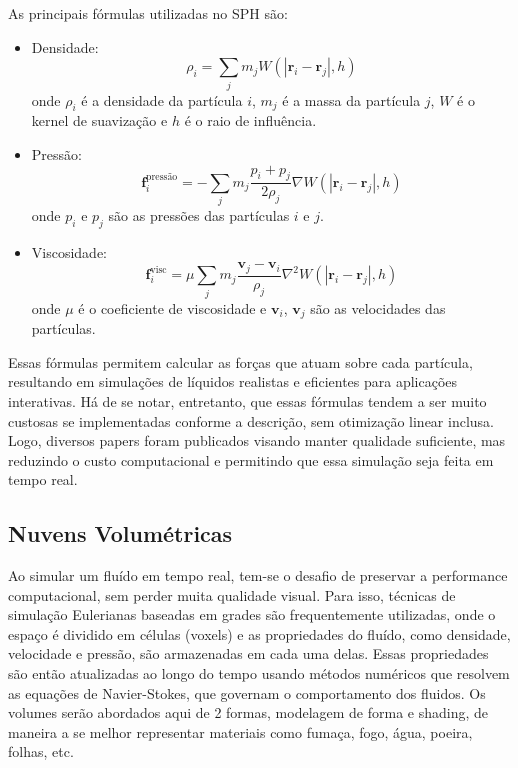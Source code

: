 As principais fórmulas utilizadas no SPH são:

\begin{itemize}
  \item Densidade: $$
\rho_i = \sum_j m_j W(|\mathbf{r}_i - \mathbf{r}_j|, h)
$$
onde $\rho_i$ é a densidade da partícula $i$, $m_j$ é a massa da partícula $j$, $W$ é o kernel de suavização e $h$ é o raio de influência.

\item Pressão: $$
\mathbf{f}_i^{\text{pressão}} = -\sum_j m_j \frac{p_i + p_j}{2 \rho_j} \nabla W(|\mathbf{r}_i - \mathbf{r}_j|, h)
$$
onde $p_i$ e $p_j$ são as pressões das partículas $i$ e $j$.

\item Viscosidade: $$
\mathbf{f}_i^{\text{visc}} = \mu \sum_j m_j \frac{\mathbf{v}_j - \mathbf{v}_i}{\rho_j} \nabla^2 W(|\mathbf{r}_i - \mathbf{r}_j|, h) $$ onde $\mu$ é o coeficiente de viscosidade e $\mathbf{v}_i$, $\mathbf{v}_j$ são as velocidades das partículas.
\end{itemize}

Essas fórmulas permitem calcular as forças que atuam sobre cada partícula, resultando em simulações de líquidos realistas e eficientes para aplicações interativas. Há de se notar, entretanto, que essas fórmulas tendem a ser muito custosas se implementadas conforme a descrição, sem otimização linear inclusa. Logo, diversos papers foram publicados visando manter qualidade suficiente, mas reduzindo o custo computacional e permitindo que essa simulação seja feita em tempo real. 


\subsection{Nuvens Volumétricas}
\label{sec:volumes}

Ao simular um fluído em tempo real, tem-se o desafio de preservar a performance computacional, sem perder muita qualidade visual. Para isso, técnicas de simulação Eulerianas baseadas em grades são frequentemente utilizadas,  onde o espaço é dividido em células (voxels) e as propriedades do fluído, como densidade, velocidade e pressão, são armazenadas em cada uma delas. Essas propriedades são então atualizadas ao longo do tempo usando métodos numéricos que resolvem as equações de Navier-Stokes, que governam o comportamento dos fluidos. Os volumes serão abordados aqui de 2 formas, modelagem de forma e shading, de maneira a se melhor representar materiais como fumaça, fogo, água, poeira, folhas, etc.

